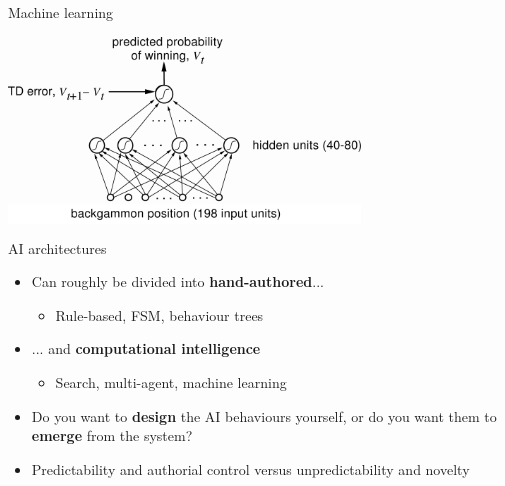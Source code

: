 \begin{frame}{Machine learning}
	\begin{center}
		\colorbox{white}{
			\includegraphics[width=0.7\textwidth]{tdgammon}
		}
	\end{center}
\end{frame}

\begin{frame}{AI architectures}
	\begin{itemize}
		\pause\item Can roughly be divided into \textbf{hand-authored}...
			\begin{itemize}
				\pause\item Rule-based, FSM, behaviour trees
			\end{itemize}
		\pause\item ... and \textbf{computational intelligence}
			\begin{itemize}
				\pause\item Search, multi-agent, machine learning
			\end{itemize}
		\pause\item Do you want to \textbf{design} the AI behaviours yourself,
			or do you want them to \textbf{emerge} from the system?
		\pause\item Predictability and authorial control versus unpredictability and novelty
	\end{itemize}
\end{frame}

